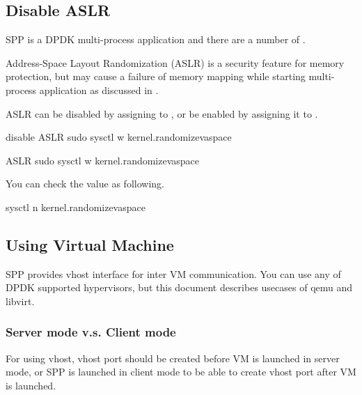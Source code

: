 \documentclass[a4paper,11pt,openany,oneside,english]{sphinxmanual}
\begin{document}
\subsection{Disable ASLR}
\label{\detokenize{gsg/setup:disable-aslr}}
SPP is a DPDK multi-process application and there are a number of
.

Address-Space Layout Randomization (ASLR) is a security feature for
memory protection, but may cause a failure of memory
mapping while starting multi-process application as discussed in
.

ASLR can be disabled by assigning  to
, or be enabled by assigning it to .

\begin{sphinxVerbatim}[commandchars=\\\{\},formatcom=\footnotesize]
 disable ASLR
 sudo sysctl \PYGZhy{}w kernel.randomize\PYGZus{}va\PYGZus{}space

  ASLR
 sudo sysctl \PYGZhy{}w kernel.randomize\PYGZus{}va\PYGZus{}space
\end{sphinxVerbatim}

You can check the value as following.

\begin{sphinxVerbatim}[commandchars=\\\{\},formatcom=\footnotesize]
 sysctl \PYGZhy{}n kernel.randomize\PYGZus{}va\PYGZus{}space
\end{sphinxVerbatim}


\subsection{Using Virtual Machine}
\label{\detokenize{gsg/setup:using-virtual-machine}}
SPP provides vhost interface for inter VM communication.
You can use any of DPDK supported hypervisors, but this document describes
usecases of qemu and libvirt.


\subsubsection{Server mode v.s. Client mode}
\label{\detokenize{gsg/setup:server-mode-v-s-client-mode}}
For using vhost, vhost port should be created before VM is launched in
server mode, or SPP is launched in client mode to be able to create
vhost port after VM is launched.
\end{document}
